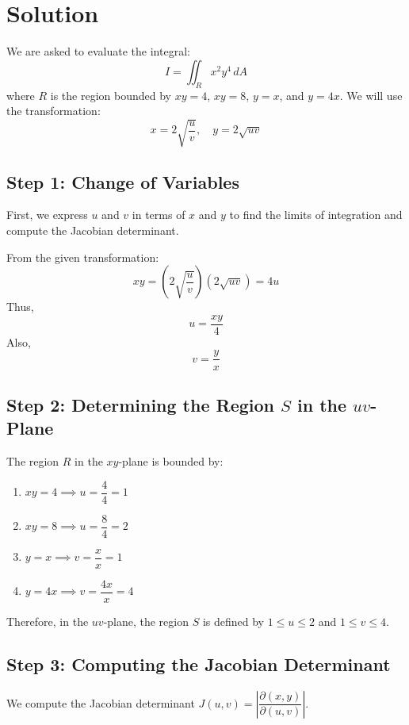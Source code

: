 \documentclass[11pt]{article}
\begin{document}
\newpage

\section{Solution}

We are asked to evaluate the integral:
\[
I = \iint_{R} x^2 y^4 \, dA
\]
where \( R \) is the region bounded by \( xy = 4 \), \( xy = 8 \), \( y = x \), and \( y = 4x \). We will use the transformation:
\[
x = 2 \sqrt{\dfrac{u}{v}}, \quad y = 2 \sqrt{u v}
\]

\newpage

\subsection{Step 1: Change of Variables}

First, we express \( u \) and \( v \) in terms of \( x \) and \( y \) to find the limits of integration and compute the Jacobian determinant.

From the given transformation:
\[
x y = \left(2 \sqrt{\dfrac{u}{v}}\right)\left(2 \sqrt{u v}\right) = 4 u
\]
Thus,
\[
u = \dfrac{x y}{4}
\]
Also,
\[
v = \dfrac{y}{x}
\]

\newpage

\subsection{Step 2: Determining the Region \( S \) in the \( uv \)-Plane}

The region \( R \) in the \( xy \)-plane is bounded by:
\begin{enumerate}
    \item \( x y = 4 \implies u = \dfrac{4}{4} = 1 \)
    \item \( x y = 8 \implies u = \dfrac{8}{4} = 2 \)
    \item \( y = x \implies v = \dfrac{x}{x} = 1 \)
    \item \( y = 4x \implies v = \dfrac{4x}{x} = 4 \)
\end{enumerate}
Therefore, in the \( uv \)-plane, the region \( S \) is defined by \( 1 \leq u \leq 2 \) and \( 1 \leq v \leq 4 \).

\newpage

\subsection{Step 3: Computing the Jacobian Determinant}

We compute the Jacobian determinant \( J(u,v) = \left| \dfrac{\partial(x,y)}{\partial(u,v)} \right| \).
\end{document}
